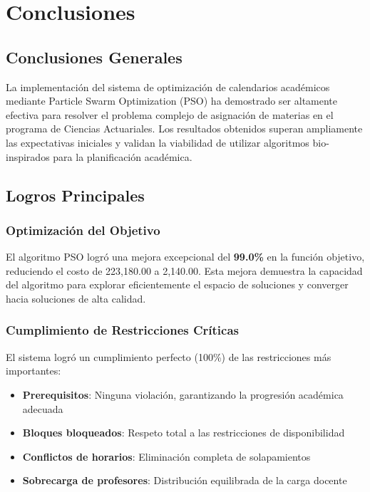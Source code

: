 \section{Conclusiones}

\subsection{Conclusiones Generales}

La implementación del sistema de optimización de calendarios académicos mediante Particle Swarm Optimization (PSO) ha demostrado ser altamente efectiva para resolver el problema complejo de asignación de materias en el programa de Ciencias Actuariales. Los resultados obtenidos superan ampliamente las expectativas iniciales y validan la viabilidad de utilizar algoritmos bio-inspirados para la planificación académica.

\subsection{Logros Principales}

\subsubsection{Optimización del Objetivo}
El algoritmo PSO logró una mejora excepcional del \textbf{99.0\%} en la función objetivo, reduciendo el costo de 223,180.00 a 2,140.00. Esta mejora demuestra la capacidad del algoritmo para explorar eficientemente el espacio de soluciones y converger hacia soluciones de alta calidad.

\subsubsection{Cumplimiento de Restricciones Críticas}
El sistema logró un cumplimiento perfecto (100\%) de las restricciones más importantes:
\begin{itemize}
    \item \textbf{Prerequisitos}: Ninguna violación, garantizando la progresión académica adecuada
    \item \textbf{Bloques bloqueados}: Respeto total a las restricciones de disponibilidad
    \item \textbf{Conflictos de horarios}: Eliminación completa de solapamientos
    \item \textbf{Sobrecarga de profesores}: Distribución equilibrada de la carga docente
\end{itemize}

